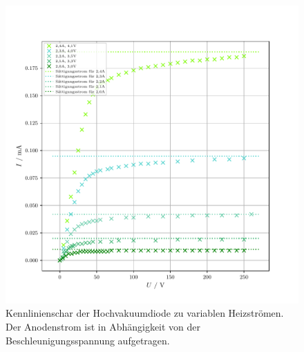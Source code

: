 \begin{figure}
  \centering
  \includegraphics{plota.pdf}
  \caption{Kennlinienschar der Hochvakuumdiode zu variablen Heizströmen. Der Anodenstrom ist in Abhängigkeit von der Beschleunigungsspannung aufgetragen.}
  \label{fig:plota}
\end{figure}

